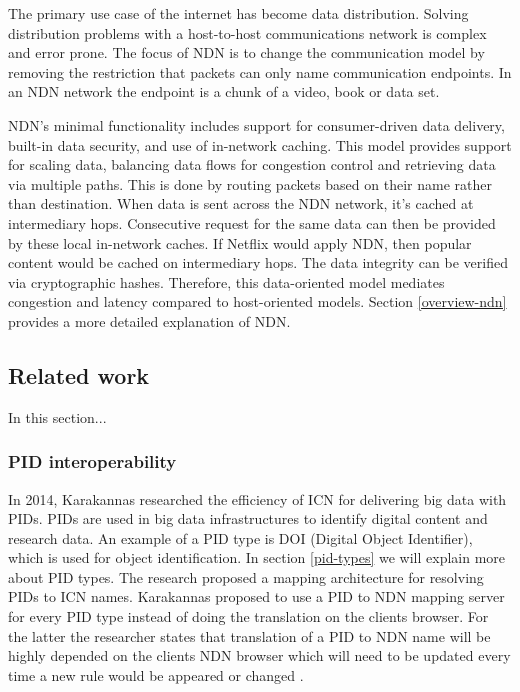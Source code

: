 The primary use case of the internet has become data distribution. Solving distribution problems with a host-to-host communications network is complex and error prone. The focus of NDN \cite{ndn-summary} is to change the communication model by removing the restriction that packets can only name communication endpoints. In an NDN network the endpoint is a chunk of a video, book or data set.

NDN’s minimal functionality includes support for consumer-driven data delivery, built-in data security, and use of in-network caching. This model provides support for scaling data, balancing data flows for congestion control and retrieving data via multiple paths. This is done by routing packets based on their name rather than destination. When data is sent across the NDN network, it's cached at intermediary hops. Consecutive request for the same data can then be provided by these local in-network caches. If Netflix would apply NDN, then popular content would be cached on intermediary hops. The data integrity can be verified via cryptographic hashes. Therefore, this data-oriented model mediates congestion and latency compared to host-oriented models. Section \ref{overview-ndn} provides a more detailed explanation of NDN.

\subsection{Related work}
\label{introduction-related-work}

In this section...

\subsubsection{PID interoperability}
In 2014, Karakannas researched the efficiency of ICN for delivering big data with PIDs. PIDs are used in big data infrastructures to identify digital content and research data. An example of a PID type is DOI (Digital Object Identifier), which is used for object identification. In section \ref{pid-types} we will explain more about PID types. The research proposed a mapping architecture for resolving PIDs to ICN names. Karakannas proposed to use a PID to NDN mapping server for every PID type instead of doing the translation on the clients browser. For the latter the researcher states that translation of a PID to NDN name will be highly depended on the clients NDN browser which will need to be updated every time a new rule would be appeared or changed \cite{icn-bd}.

